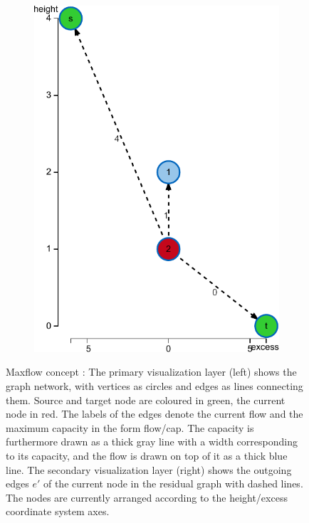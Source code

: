 \begin{figure}
\begin{subfigure}[t]{0.45\textwidth}
\includegraphics[width=\textwidth]{fig/maxflow-graph-algorithm-height}
\end{subfigure}
\caption{Maxflow concept : The primary visualization layer (left) shows the graph network, with vertices as circles and edges as lines connecting them. Source and target node are coloured in green, the current node in red. The labels of the edges denote the current flow and the maximum capacity in the form flow/cap. The capacity is furthermore drawn as a thick gray line with a width corresponding to its capacity, and the flow is drawn on top of it as a thick blue line. The secondary visualization layer (right) shows the outgoing edges $e'$ of the current node in the residual graph with dashed lines. The nodes are currently arranged according to the height/excess coordinate system axes.}
\label{fig:maxflow}
\end{figure}





